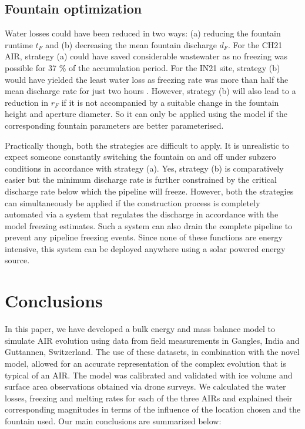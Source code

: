 \documentclass[utf8]{frontiersSCNS}
\begin{document}
\subsection{Fountain optimization}

Water losses could have been reduced in two ways: (a) reducing the fountain runtime $t_F$ and (b) decreasing the
mean fountain discharge $d_F$. For the CH21 AIR, strategy (a) could have saved considerable wastewater as no
freezing was possible for 37 \% of the accumulation period. For the IN21 site, strategy (b) would have yielded
the least water loss as freezing rate was more than half the mean discharge rate for just two hours . However,
strategy (b) will also lead to a reduction in $r_F$ if it is not accompanied by a suitable change in the
fountain height and aperture diameter. So it can only be applied using the model if the corresponding fountain
parameters are better parameterised.

Practically though, both the strategies are difficult to apply. It is unrealistic to expect someone constantly
switching the fountain on and off under subzero conditions in accordance with strategy (a). Yes, strategy (b) is
comparatively easier but the minimum discharge rate is further constrained by the critical discharge rate below
which the pipeline will freeze. However, both the strategies can simultaneously be applied if the construction
process is completely automated via a system that regulates the discharge in accordance with the model freezing
estimates. Such a system can also drain the complete pipeline to prevent any pipeline freezing events. Since
none of these functions are energy intensive, this system can be deployed anywhere using a solar powered energy
source.

\section{Conclusions}

In this paper, we have developed a bulk energy and mass balance model to simulate AIR evolution using data from
field measurements in Gangles, India and Guttannen, Switzerland. The use of these datasets, in combination with
the novel model, allowed for an accurate representation of the complex evolution that is typical of an AIR. The model was
calibrated and validated with ice volume and surface area observations obtained via drone surveys. We calculated
the water losses, freezing and melting rates for each of the three AIRs and explained their corresponding
magnitudes in terms of the influence of the location chosen and the fountain used. Our main conclusions are
summarized below:
\end{document}
